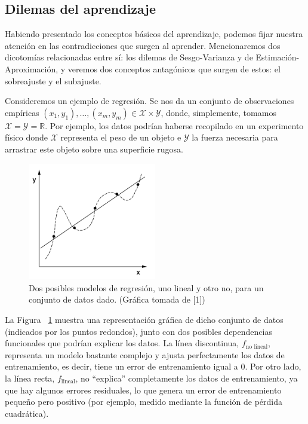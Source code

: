 \documentclass{report}
\begin{document}
\subsection{Dilemas del aprendizaje}

Habiendo presentado los conceptos básicos del aprendizaje, podemos fijar nuestra atención en las contradicciones que surgen
al aprender. Mencionaremos dos dicotomías relacionadas entre sí: los dilemas de Sesgo-Varianza y de Estimación-Aproximación,
y veremos dos conceptos antagónicos que surgen de estos: el sobreajuste y el subajuste.\newline


Consideremos un ejemplo de regresión. Se nos da un conjunto de observaciones empíricas 
\((x_1, y_1), \dots, (x_m, y_m) \in \mathcal{X} \times \mathcal{Y}\), donde, simplemente, tomamos \(\mathcal{X} = \mathcal{Y} = \mathbb{R}\). 
Por ejemplo, los datos podrían haberse recopilado en un experimento físico donde \(\mathcal{X}\) representa el peso 
de un objeto e \(\mathcal{Y}\) la fuerza necesaria para arrastrar este objeto sobre una superficie rugosa.\newline

\begin{figure}[ht!]
    \centering
    \includegraphics[width=0.5\textwidth]{Images/1.png}
    \caption{Dos posibles modelos de regresión, uno lineal y otro no, para un conjunto de datos dado. (Gráfica tomada de [1])}
    \label{fig:Sobreajuste y subajuste}
\end{figure}

La Figura ~\ref{fig:Sobreajuste y subajuste} muestra una representación gráfica de dicho conjunto de datos (indicados por los puntos redondos), 
junto con dos posibles dependencias funcionales que podrían explicar los datos. 
La línea discontinua, \(f_{\text{no lineal}}\), representa un modelo bastante complejo y ajusta perfectamente 
los datos de entrenamiento, es decir, tiene un error de entrenamiento igual a 0. Por otro lado, 
la línea recta, \(f_{\text{lineal}}\), no “explica” completamente los datos de entrenamiento, 
ya que hay algunos errores residuales, lo que genera un error de entrenamiento pequeño pero positivo 
(por ejemplo, medido mediante la función de pérdida cuadrática).\newline
\end{document}
